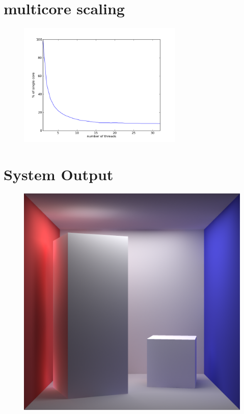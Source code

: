 \section{multicore scaling}
\begin{figure}[h]
\centering
\includegraphics[width=0.7\textwidth]{./images/results/raytrace_multicore.png}
\end{figure}

\section{System Output}

\begin{figure}
\includegraphics[width=\textwidth]{./images/renders/box.png}
\end{figure}

